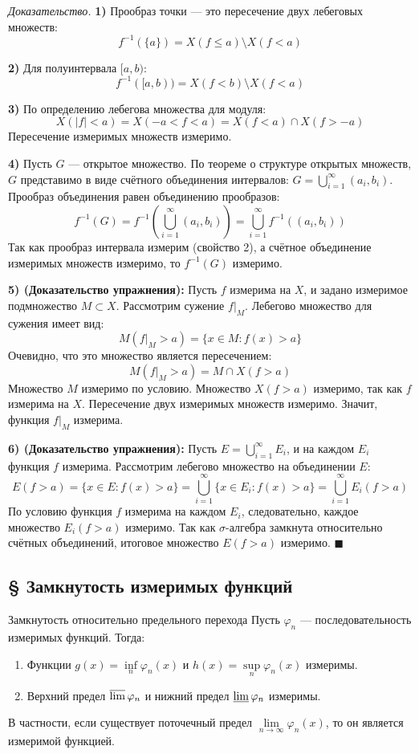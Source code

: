 \documentclass[12pt,a4paper]{article}
\newenvironment{Proof}[1][Доказательство]{\vspace{0.5em}\noindent\textit{#1.}\hspace{0.5em}\ignorespaces}{\hfill$\blacksquare$\vspace{1em}}
\begin{document}
\begin{Proof}
\textbf{1)} Прообраз точки — это пересечение двух лебеговых множеств: 
$$ f^{-1}(\{a\}) = X(f \le a) \setminus X(f < a) $$

\textbf{2)} Для полуинтервала $[a, b)$:
$$ f^{-1}([a, b)) = X(f < b) \setminus X(f < a) $$

\textbf{3)} По определению лебегова множества для модуля:
$$ X(|f| < a) = X(-a < f < a) = X(f < a) \cap X(f > -a) $$
Пересечение измеримых множеств измеримо.

\textbf{4)} Пусть $G$ — открытое множество. По теореме о структуре открытых множеств, $G$ представимо в виде счётного объединения интервалов: $G = \bigcup\limits_{i=1}^{\infty} (a_i, b_i)$.
Прообраз объединения равен объединению прообразов:
$$ f^{-1}(G) = f^{-1}\left(\bigcup\limits_{i=1}^{\infty} (a_i, b_i)\right) = \bigcup\limits_{i=1}^{\infty} f^{-1}((a_i, b_i)) $$
Так как прообраз интервала измерим (свойство 2), а счётное объединение измеримых множеств измеримо, то $f^{-1}(G)$ измеримо.

\textbf{5) (Доказательство упражнения):} Пусть $f$ измерима на $X$, и задано измеримое подмножество $M \subset X$. Рассмотрим сужение $f|_M$. 
Лебегово множество для сужения имеет вид:
$$ M(f|_M > a) = \{ x \in M : f(x) > a \} $$
Очевидно, что это множество является пересечением:
$$ M(f|_M > a) = M \cap X(f > a) $$
Множество $M$ измеримо по условию. Множество $X(f > a)$ измеримо, так как $f$ измерима на $X$. Пересечение двух измеримых множеств измеримо. Значит, функция $f|_M$ измерима.

\textbf{6) (Доказательство упражнения):} Пусть $E = \bigcup\limits_{i=1}^{\infty} E_i$, и на каждом $E_i$ функция $f$ измерима. 
Рассмотрим лебегово множество на объединении $E$:
$$ E(f > a) = \{ x \in E : f(x) > a \} = \bigcup\limits_{i=1}^{\infty} \{ x \in E_i : f(x) > a \} = \bigcup\limits_{i=1}^{\infty} E_i(f > a) $$
По условию функция $f$ измерима на каждом $E_i$, следовательно, каждое множество $E_i(f > a)$ измеримо. Так как $\sigma$-алгебра замкнута относительно счётных объединений, итоговое множество $E(f > a)$ измеримо.
\end{Proof}

\subsection{§ Замкнутость измеримых функций}

\begin{Theorem}{Замкнутость относительно предельного перехода}{}
Пусть $\varphi_n$ — последовательность измеримых функций. Тогда:
\begin{enumerate}
    \item Функции $g(x) = \inf\limits_n \varphi_n(x)$ и $h(x) = \sup\limits_n \varphi_n(x)$ измеримы.
    \item Верхний предел $\varlimsup \varphi_n$ и нижний предел $\varliminf \varphi_n$ измеримы.
\end{enumerate}
В частности, если существует поточечный предел $\lim\limits_{n \to \infty} \varphi_n(x)$, то он является измеримой функцией.
\end{Theorem}
\end{document}
